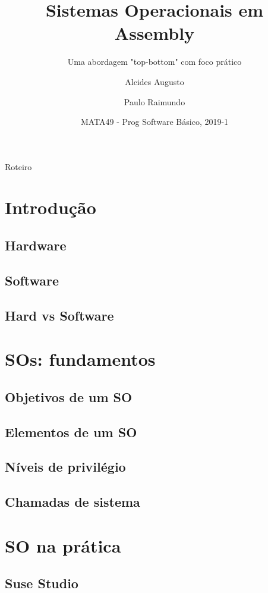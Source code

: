 \documentclass{beamer}
\title{Sistemas Operacionais em Assembly}
\subtitle{Uma abordagem "top-bottom" com foco prático}
\author{Alcides Augusto
  \and 
  Paulo Raimundo
}
\institute[Universidade Federal da Bahia] %
{
  Colegiado de Engenharia da Computação\\
  Universidade Federal da Bahia\\
}
\date{MATA49 - Prog Software Básico, 2019-1}
\begin{document}
\begin{frame}
  \titlepage
\end{frame}

\begin{frame}{Roteiro}
  \tableofcontents
\end{frame}

\section{Introdução}
\subsection{Hardware}
\subsection{Software}
\subsection{Hard vs Software}

\section{SOs: fundamentos}

\subsection{Objetivos de um SO}
\subsection{Elementos de um SO}
\subsection{Níveis de privilégio}
\subsection{Chamadas de sistema}

\section{SO na prática}

\subsection{Suse Studio}
\end{document}
